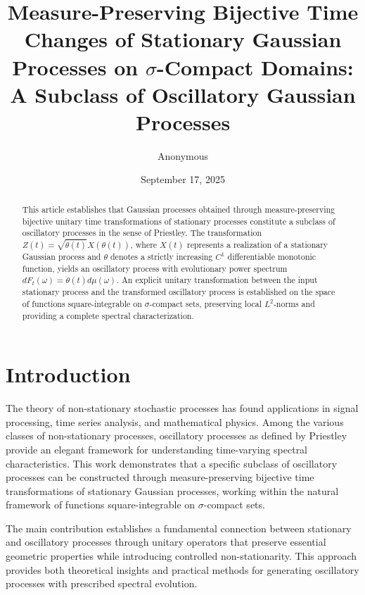 \documentclass{article}
\begin{document}
\title{Measure-Preserving Bijective Time Changes of Stationary Gaussian
Processes on $\sigma$-Compact Domains: A Subclass of Oscillatory Gaussian
Processes}

\author{Anonymous}

\date{September 17, 2025}

\maketitle

\begin{abstract}
  This article establishes that Gaussian processes obtained through
  measure-preserving bijective unitary time transformations of stationary
  processes constitute a subclass of oscillatory processes in the sense of
  Priestley. The transformation $Z (t) = \sqrt{\dot{\theta} (t)} X (\theta
  (t))$, where $X (t)$ represents a realization of a stationary Gaussian
  process and $\theta$ denotes a strictly increasing $C^1$ differentiable
  monotonic function, yields an oscillatory process with evolutionary power
  spectrum $dF_t (\omega) = \dot{\theta} (t) d \mu (\omega)$. An explicit
  unitary transformation between the input stationary process and the
  transformed oscillatory process is established on the space of functions
  square-integrable on $\sigma$-compact sets, preserving local $L^2$-norms and
  providing a complete spectral characterization.
\end{abstract}

{\tableofcontents}

\section{Introduction}

The theory of non-stationary stochastic processes has found applications in
signal processing, time series analysis, and mathematical physics. Among the
various classes of non-stationary processes, oscillatory processes as defined
by Priestley provide an elegant framework for understanding time-varying
spectral characteristics. This work demonstrates that a specific subclass of
oscillatory processes can be constructed through measure-preserving bijective
time transformations of stationary Gaussian processes, working within the
natural framework of functions square-integrable on $\sigma$-compact sets.

The main contribution establishes a fundamental connection between stationary
and oscillatory processes through unitary operators that preserve essential
geometric properties while introducing controlled non-stationarity. This
approach provides both theoretical insights and practical methods for
generating oscillatory processes with prescribed spectral evolution.
\end{document}
